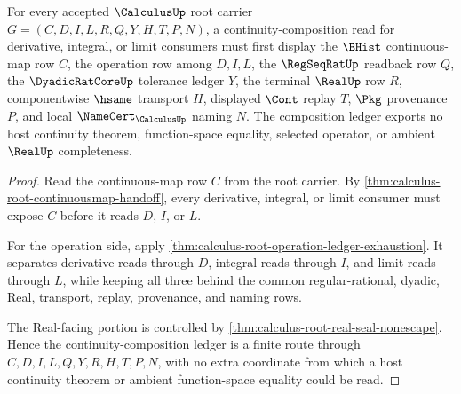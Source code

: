 \begin{theorem}
\label{thm:calculus-root-continuity-composition-ledger}
For every accepted $\CalculusUp$ root carrier $G=(C,D,I,L,R,Q,Y,H,T,P,N)$, a continuity-composition read for derivative, integral, or limit consumers must first display the $\BHist$ continuous-map row $C$, the operation row among $D,I,L$, the $\RegSeqRatUp$ readback row $Q$, the $\DyadicRatCoreUp$ tolerance ledger $Y$, the terminal $\RealUp$ row $R$, componentwise $\hsame$ transport $H$, displayed $\Cont$ replay $T$, $\Pkg$ provenance $P$, and local $\NameCert_{\CalculusUp}$ naming $N$. The composition ledger exports no host continuity theorem, function-space equality, selected operator, or ambient $\RealUp$ completeness.
\end{theorem}
\begin{proof}
Read the continuous-map row $C$ from the root carrier. By \autoref{thm:calculus-root-continuousmap-handoff}, every derivative, integral, or limit consumer must expose $C$ before it reads $D$, $I$, or $L$.

For the operation side, apply \autoref{thm:calculus-root-operation-ledger-exhaustion}. It separates derivative reads through $D$, integral reads through $I$, and limit reads through $L$, while keeping all three behind the common regular-rational, dyadic, Real, transport, replay, provenance, and naming rows.

The Real-facing portion is controlled by \autoref{thm:calculus-root-real-seal-nonescape}. Hence the continuity-composition ledger is a finite route through $C,D,I,L,Q,Y,R,H,T,P,N$, with no extra coordinate from which a host continuity theorem or ambient function-space equality could be read.
\end{proof}

